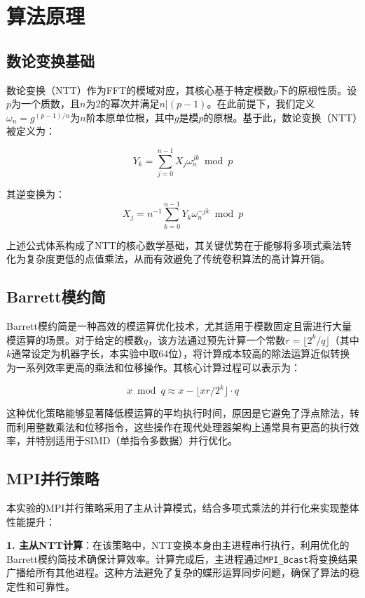 \documentclass[a4paper]{article}
\begin{document}
\section{算法原理}

\subsection{数论变换基础}

数论变换（NTT）作为FFT的模域对应，其核心基于特定模数$p$下的原根性质。设$p$为一个质数，且$n$为2的幂次并满足$n|(p-1)$。在此前提下，我们定义$\omega_n = g^{(p-1)/n}$为$n$阶本原单位根，其中$g$是模$p$的原根。基于此，数论变换（NTT）被定义为：

$$Y_k = \sum_{j=0}^{n-1} X_j \omega_n^{jk} \bmod p$$

其逆变换为：
$$X_j = n^{-1} \sum_{k=0}^{n-1} Y_k \omega_n^{-jk} \bmod p$$

上述公式体系构成了NTT的核心数学基础，其关键优势在于能够将多项式乘法转化为复杂度更低的点值乘法，从而有效避免了传统卷积算法的高计算开销。

\subsection{Barrett模约简}

Barrett模约简是一种高效的模运算优化技术，尤其适用于模数固定且需进行大量模运算的场景。对于给定的模数$q$，该方法通过预先计算一个常数$r = \lfloor 2^k/q \rfloor$（其中$k$通常设定为机器字长，本实验中取64位），将计算成本较高的除法运算近似转换为一系列效率更高的乘法和位移操作。其核心计算过程可以表示为：

$$x \bmod q \approx x - \lfloor xr/2^k \rfloor \cdot q$$

这种优化策略能够显著降低模运算的平均执行时间，原因是它避免了浮点除法，转而利用整数乘法和位移指令，这些操作在现代处理器架构上通常具有更高的执行效率，并特别适用于SIMD（单指令多数据）并行优化。

\subsection{MPI并行策略}

本实验的MPI并行策略采用了主从计算模式，结合多项式乘法的并行化来实现整体性能提升：

\textbf{1. 主从NTT计算}：在该策略中，NTT变换本身由主进程串行执行，利用优化的Barrett模约简技术确保计算效率。计算完成后，主进程通过\texttt{MPI\_Bcast}将变换结果广播给所有其他进程。这种方法避免了复杂的蝶形运算同步问题，确保了算法的稳定性和可靠性。
\end{document}
